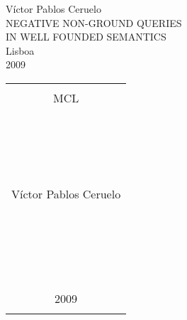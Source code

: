 \documentclass[12pt,twoside,a4paper,english]{book}
\renewcommand{\title}{NEGATIVE NON-GROUND QUERIES \\ IN WELL FOUNDED SEMANTICS}
\renewcommand{\author}{V\'{i}ctor Pablos Ceruelo}
\theoremstyle{example}
\theoremstyle{example*}
\theoremstyle{program}
\theoremstyle{th-head}
\theoremstyle{remark}
\theoremstyle{algorithm}
\begin{document}

\pagestyle{empty}

\vspace{1cm}
\begin{center}
  \begin{huge}
    \author \\
    \vspace{9cm}
    \title \\
    \vspace{9cm}
    Lisboa \\
    \vspace{0.5cm}
    2009
  \end{huge}
\end{center}

\clearpage

\pagestyle{empty}
\begin{tabular}{|c|}\hline

\hline
\\
MCL
\\ \\ \\ \\ \\ \\ \\ \\ \\ \\ \\ \\ \\ \\ \\ \\  

\begin{sideways}
\begin{large}
\author
\end{large}
\end{sideways}
\\ \\ \\ \\ \\ \\ \\ \\ \\ \\ \\ \\ \\ \\ \\ \\ 

\\ \\
2009 
\\
\\
\hline
\end{tabular}
\end{document}

